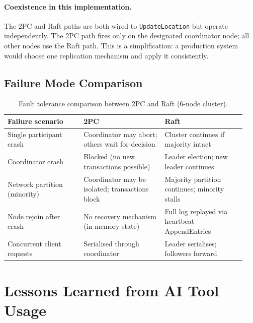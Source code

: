\documentclass[11pt]{article}
\newcommand{\rpc}[1]{\texttt{#1}}
\begin{document}
\paragraph{Coexistence in this implementation.}
The 2PC and Raft paths are both wired to \rpc{UpdateLocation} but operate independently.
The 2PC path fires only on the designated coordinator node; all other nodes use the Raft
path.  This is a simplification: a production system would choose one replication
mechanism and apply it consistently.

\subsection{Failure Mode Comparison}

\begin{table}[H]
\centering
\caption{Fault tolerance comparison between 2PC and Raft (6-node cluster).}
\label{tab:fault-comparison}
\renewcommand{\arraystretch}{1.12}
\begin{tabular}{p{0.30\linewidth} p{0.32\linewidth} p{0.32\linewidth}}
\toprule
\textbf{Failure scenario}           & \textbf{2PC}                         & \textbf{Raft} \\
\midrule
Single participant crash            & Coordinator may abort; others wait for decision & Cluster continues if majority intact \\
Coordinator crash                   & Blocked (no new transactions possible) & Leader election; new leader continues \\
Network partition (minority)        & Coordinator may be isolated; transactions block & Majority partition continues; minority stalls \\
Node rejoin after crash             & No recovery mechanism (in-memory state) & Full log replayed via heartbeat AppendEntries \\
Concurrent client requests          & Serialised through coordinator         & Leader serialises; followers forward \\
\bottomrule
\end{tabular}
\renewcommand{\arraystretch}{1.0}
\end{table}

\section{Lessons Learned from AI Tool Usage}
\end{document}
